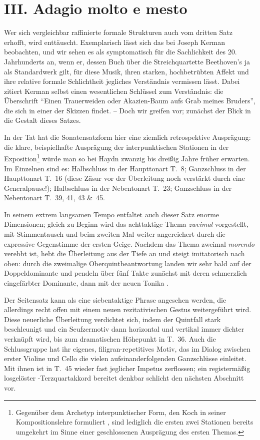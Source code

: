 \section{III. Adagio molto e mesto}

Wer sich vergleichbar raffinierte formale Strukturen auch
vom dritten Satz erhofft, wird enttäuscht.  Exemplarisch lässt
sich das bei Joseph Kerman beobachten, und wir sehen es
als symptomatisch für die Sachlichkeit des 20. Jahrhunderts
an, wenn er, dessen Buch über die Streichquartette
Beethoven’s ja als Standardwerk gilt, für diese Musik, ihren
starken, hochbetrübten Affekt und ihre relative formale
Schlichtheit jegliches Verständnis vermissen lässt\cite[S.~109\,ff.]{kerman}.  Dabei
zitiert Kerman selbst einen wesentlichen Schlüssel zum Verständnis: die
Überschrift \enquote{Einen Trauerweiden oder Akazien-Baum aufs Grab meines
Bruders}, die sich in einer der Skizzen findet. – Doch wir
greifen vor; zunächst der Blick in die Gestalt dieses Satzes.

In der Tat hat die Sonatensatzform hier eine ziemlich retrospektive
Ausprägung: die klare, beispielhafte Ausprägung der interpunktischen
Stationen in der Exposition\footnote{Gegenüber dem Archetyp
interpunktischer Form, den Koch in seiner Kompositionslehre formuliert
\parencite{koch}, sind lediglich die ersten zwei Stationen bereits
umgekehrt im Sinne einer geschlossenen Ausprägung des ersten Themas.}
würde man so bei Haydn zwanzig bis dreißig Jahre früher erwarten.  Im
Einzelnen sind es: Halbschluss in der Haupttonart T.~8; Ganzschluss
in der Haupttonart T.~16 (diese Zäsur vor der Überleitung noch
verstärkt durch eine Generalpause!); Halbschluss in der Nebentonart
T.~23; Ganzschluss in der Nebentonart T.~39, 41, 43 \&~45.

In seinem extrem langsamen Tempo entfaltet auch dieser Satz
enorme Dimensionen; gleich zu Beginn wird das achttaktige Thema
\emph{zweimal} vorgestellt, mit Stimmentausch und beim zweiten Mal
weiter angereichert durch die expressive Gegenstimme der ersten
Geige.  Nachdem das Thema zweimal \textit{morendo} verebbt ist,
hebt die Überleitung aus der Tiefe an und steigt imitatorisch
nach oben: durch die zweimalige Oberquintbeantwortung landen wir
sehr bald auf der Doppeldominante  und pendeln über
fünf Takte zunächst mit deren schmerzlich eingefärbter Dominante,
dann mit der neuen Tonika .

Der Seitensatz kann als eine siebentaktige Phrase angesehen werden,
die allerdings recht offen mit einem neuen rezitativischen Gestus
weitergeführt wird.  Diese neuerliche Überleitung verdichtet sich,
indem der Quintfall stark beschleunigt und ein Seufzermotiv dann
horizontal und vertikal immer dichter verknüpft wird, bis zum
dramatischen Höhepunkt in T.~36.  Auch die Schlussgruppe hat ihr
eigenes, filigran-repetitives Motiv, das im Dialog zwischen erster
Violine und Cello die vielen aufeinanderfolgenden Ganzschlüsse
einleitet.  Mit ihnen ist in T.~45 wieder fast jeglicher Impetus
zerflossen; ein registermäßig losgelöster -Terzquartakkord
bereitet denkbar schlicht den nächsten Abschnitt vor.

